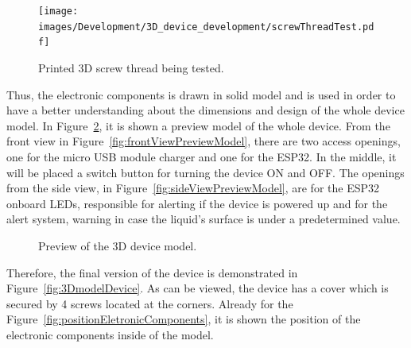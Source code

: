 \begin{figure}[h!]
    \centering
    \texttt{[image: images/Development/3D\_device\_development/screwThreadTest.pdf]}
    \caption{Printed 3D screw thread being tested.}
    \label{fig:3DscrewThead}
\end{figure}

Thus, the electronic components is drawn in solid model and is used in order to have a better understanding about the dimensions and design of the whole device model. In Figure~\ref{fig:preview3Dmodell}, it is shown a preview model of the whole device. From the front view in Figure~\ref{fig:frontViewPreviewModel}, there are two access openings, one for the micro USB module charger and one for the ESP32. In the middle, it will be placed a switch button for turning the device ON and OFF. The openings from the side view, in Figure~\ref{fig:sideViewPreviewModel}, are for the ESP32 onboard \gls{LED}s, responsible for alerting if the device is powered up and for the alert system, warning in case the liquid's surface is under a predetermined value.

\begin{figure}[h!]
    \centering
    \quad\quad\quad\quad
    \caption{Preview of the 3D device model.}
    \label{fig:preview3Dmodell}
\end{figure}

Therefore, the final version of the device is demonstrated in Figure~\ref{fig:3DmodelDevice}. As can be viewed, the device has a cover which is secured by 4 screws located at the corners. Already for the Figure~\ref{fig:positionEletronicComponents}, it is shown the position of the electronic components inside of the model.

